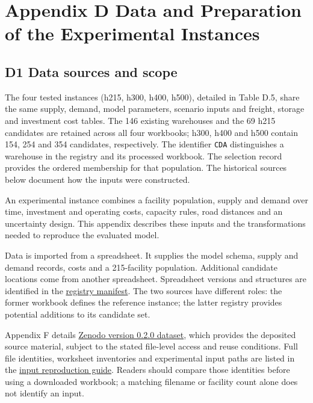 \documentclass[
  english,
  11pt,
  a4paper,
]{article}
\begin{document}
\newpage{}

\section{Appendix D Data and Preparation of the Experimental
Instances}\label{appendix-d-data-and-preparation-of-the-experimental-instances}

\subsection{D1 Data sources and scope}\label{d1-data-sources-and-scope}

The four tested instances (h215, h300, h400, h500), detailed in Table D.5, share the same supply, demand, model parameters, scenario inputs and freight,
storage and investment cost tables. The 146 existing warehouses and the
69 h215 candidates are retained across all four workbooks; h300, h400
and h500 contain 154, 254 and 354 candidates, respectively. The
identifier \texttt{CDA} distinguishes a warehouse in the registry and
its processed workbook. The selection record provides the ordered
membership for that population. The historical sources below document
how the inputs were constructed.

An experimental instance combines a facility population, supply and
demand over time, investment and operating costs, capacity rules, road
distances and an uncertainty design. This appendix describes these
inputs and the transformations needed to reproduce the evaluated model.

Data is imported from a spreadsheet. It supplies the model
schema, supply and demand records, costs and a 215-facility population.
Additional candidate locations come from
another spreadsheet. Spreadsheet versions and structures
are identified in the
\href{https://github.com/unb-lamfo-or-ai-hpc/model-agrologistic/blob/1b54023f4e0c0c27aba64883b1e9cf25817ad0f8/data/manifests/warehouse_population_source_v020.json}{registry
manifest}. The two sources have different roles: the former workbook defines the reference instance; the latter registry provides potential additions to its candidate set.

Appendix F details \href{https://doi.org/10.5281/zenodo.22751909}{Zenodo version 0.2.0
dataset}, which provides the deposited source material, subject to the stated file-level access and reuse conditions. Full file identities, worksheet inventories and experimental input paths are listed in the
\href{https://github.com/unb-lamfo-or-ai-hpc/model-agrologistic/blob/1b54023f4e0c0c27aba64883b1e9cf25817ad0f8/docs/evidence/appendix_input_reproduction_20261028.json}{input
reproduction guide}. Readers should compare those identities before using a downloaded workbook; a matching filename or facility count alone does not identify an input.
\end{document}
